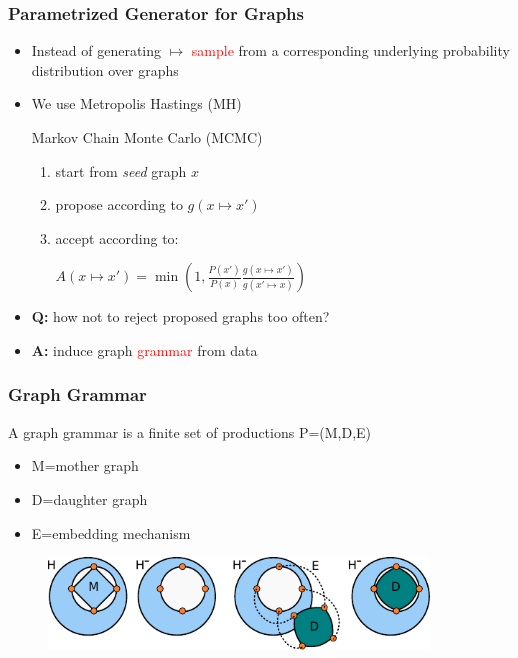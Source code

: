 \documentclass{beamer}
\newcommand{\red}[1]{\textcolor{red}{#1}}
\begin{document}
\begin{frame}
    \frametitle{Parametrized Generator for Graphs}
    \begin{itemize}
        \item Instead of generating $\mapsto$ \red{sample} from a corresponding underlying probability distribution over graphs
        \item We use Metropolis Hastings (MH) \begin{tiny}Markov Chain Monte Carlo (MCMC)\end{tiny}
        \begin{enumerate}
            \item start from {\em seed} graph $x$
            \item propose according to $g(x \mapsto x')$
            \item accept according to: \\
            \begin{center}
            $A(x \mapsto x')=\min(1, \frac{P(x')}{P(x)} \frac{g(x \mapsto x')}{g(x' \mapsto x)})$
            \end{center}
        \end{enumerate}
        \item {\bf Q:} how not to reject proposed graphs too often?
        \item {\bf A:} induce graph \red{grammar} from data
    \end{itemize}
\end{frame}

\begin{frame}
    \frametitle{Graph Grammar}
    A graph grammar is a finite set of productions P=(M,D,E) 
    \begin{itemize}
        \item M=mother graph
        \item D=daughter graph
        \item E=embedding mechanism
    \end{itemize}
    \begin{figure}[ht]
        \centering
        \includegraphics[width=0.9\textwidth]{images/grammar.pdf}
    \end{figure}
\end{frame}
\end{document}
